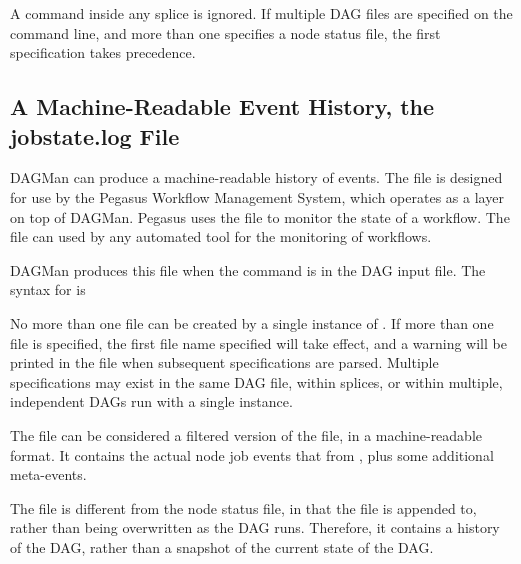 A  command inside any splice is ignored.
If multiple DAG files are specified on the  command line,
and more than one specifies a node status file,
the first specification takes precedence.

\subsection{\label{sec:DAGJobstateLog}A Machine-Readable Event History, the jobstate.log File}

DAGMan can produce a machine-readable history of events.
The  file is designed for use by the Pegasus Workflow
Management System, which operates as a layer on top of DAGMan.  Pegasus
uses the  file to monitor the state of a workflow.
The  file can used by any
automated tool for the monitoring of workflows.

DAGMan produces this file when the command  is
in the DAG input file.
The syntax for  is

 

No more than one  file can be created by a single
instance of .
If more than one  file is specified,
the first file name specified will take effect,
and a warning will be printed in the  file
when subsequent  specifications are parsed.
Multiple specifications may exist in the same DAG file, within splices,
or within multiple, independent DAGs run with a single  instance.

The  file can be considered a filtered
version of the  file, in a machine-readable format.
It contains the actual node job events that from ,
plus some additional meta-events.

The  file is different from the node status file,
in that the  file is appended to,
rather than being overwritten as the DAG runs.
Therefore, it contains a history of the DAG,
rather than a snapshot of the current state of the DAG.

